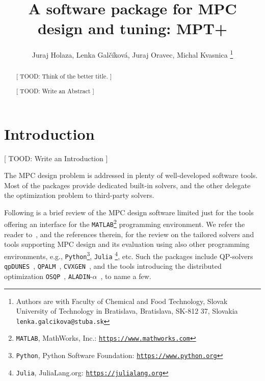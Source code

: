\documentclass[letterpaper, 10 pt, conference]{ieeeconf}
\title{\LARGE \bf
A software package for MPC design and tuning: MPT+
}
\author{Juraj Holaza, Lenka Gal\v{c}\'{i}kov\'{a}, Juraj Oravec, Michal Kvasnica
\thanks{Authors are with Faculty of Chemical and Food Technology,
		Slovak University of Technology in Bratislava, Bratislava, SK-812 37, Slovakia
        \texttt{lenka.galcikova@stuba.sk}}
}
\begin{document}
\maketitle
\thispagestyle{empty}
\pagestyle{empty}

\begin{abstract}

[ TOOD: Think of the better title. ]

[ TOOD: Write an Abstract ]

\end{abstract}

\section{Introduction}
\label{sec:introduction}

[ TOOD: Write an Introduction ]

The MPC design problem is addressed in plenty of well-developed software tools. Most of the packages provide dedicated built-in solvers, and the other delegate the optimization problem to third-party solvers. 

Following is a brief review of the MPC design software limited just for the tools offering an interface for the \texttt{MATLAB}\footnote{\texttt{MATLAB}, MathWorks, Inc.: \texttt{\url{https://www.mathworks.com}}} programming environment. We refer the reader to~\cite{KF18,LT17,HS22}, 
and the references therein, for the review on the tailored solvers and tools supporting MPC design and its evaluation using also other programming environments, e.g., \texttt{Python}\footnote{\texttt{Python}, Python Software Foundation: \texttt{\url{https://www.python.org}}}, \texttt{Julia} \footnote{\texttt{Julia}, JuliaLang.org: \texttt{\url{https://julialang.org}}}, etc. Such the packages include QP-solvers \texttt{qpDUNES}~\cite{qpDUNES}, \texttt{QPALM}~\cite{QPALM}, \texttt{CVXGEN}~\cite{CVXGEN}, and the tools introducing the distributed optimization \texttt{OSQP}~\cite{OSQP}, \texttt{ALADIN}-$\alpha$~\cite{EJ21}, to name a few. 
\end{document}
